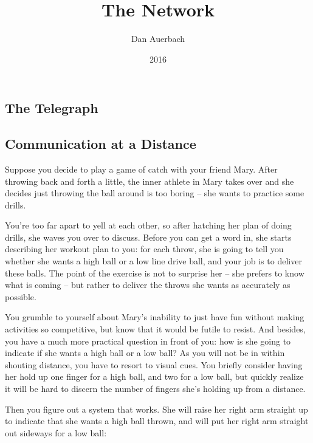 \documentclass[UTF8]{book}
\begin{document}
\begin{CJK}{UTF8}{gbsn}

\title{The Network}
\author{Dan Auerbach}
\date{2016}
\maketitle


\part{The Telegraph}

\chapter{Communication at a Distance}

Suppose you decide to play a game of catch with your friend Mary. After throwing back and forth a little, the inner athlete in Mary takes over and she decides just throwing the ball around is too boring -- she wants to practice some drills.

You're too far apart to yell at each other, so after hatching her plan of doing drills, she waves you over to discuss. Before you can get a word in, she starts describing her workout plan to you: for each throw, she is going to tell you whether she wants a high ball or a low line drive ball, and your job is to deliver these balls. The point of the exercise is not to surprise her -- she prefers to know what is coming -- but rather to deliver the throws she wants as accurately as possible.

You grumble to yourself about Mary's inability to just have fun without making activities so competitive, but know that it would be futile to resist. And besides, you have a much more practical question in front of you: how is she going to indicate if she wants a high ball or a low ball? As you will not be in within shouting distance, you have to resort to visual cues. You briefly consider having her hold up one finger for a high ball, and two for a low ball, but quickly realize it will be hard to discern the number of fingers she's holding up from a distance.

Then you figure out a system that works. She will raise her right arm straight up to indicate that she wants a high ball thrown, and will put her right arm straight out sideways for a low ball:


\end{CJK}
\end{document}
